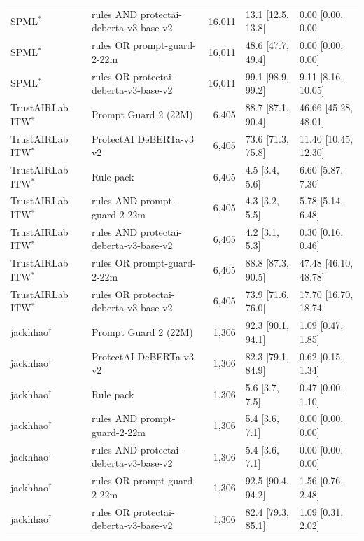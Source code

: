 \begin{tabular}{llrll}
SPML$^*$ & rules AND protectai-deberta-v3-base-v2 & 16,011 & 13.1 [12.5, 13.8] & 0.00 [0.00, 0.00] \\
SPML$^*$ & rules OR prompt-guard-2-22m & 16,011 & 48.6 [47.7, 49.4] & 0.00 [0.00, 0.00] \\
SPML$^*$ & rules OR protectai-deberta-v3-base-v2 & 16,011 & 99.1 [98.9, 99.2] & 9.11 [8.16, 10.05] \\
TrustAIRLab ITW$^*$ & Prompt Guard 2 (22M) & 6,405 & 88.7 [87.1, 90.4] & 46.66 [45.28, 48.01] \\
TrustAIRLab ITW$^*$ & ProtectAI DeBERTa-v3 v2 & 6,405 & 73.6 [71.3, 75.8] & 11.40 [10.45, 12.30] \\
TrustAIRLab ITW$^*$ & Rule pack & 6,405 & 4.5 [3.4, 5.6] & 6.60 [5.87, 7.30] \\
TrustAIRLab ITW$^*$ & rules AND prompt-guard-2-22m & 6,405 & 4.3 [3.2, 5.5] & 5.78 [5.14, 6.48] \\
TrustAIRLab ITW$^*$ & rules AND protectai-deberta-v3-base-v2 & 6,405 & 4.2 [3.1, 5.3] & 0.30 [0.16, 0.46] \\
TrustAIRLab ITW$^*$ & rules OR prompt-guard-2-22m & 6,405 & 88.8 [87.3, 90.5] & 47.48 [46.10, 48.78] \\
TrustAIRLab ITW$^*$ & rules OR protectai-deberta-v3-base-v2 & 6,405 & 73.9 [71.6, 76.0] & 17.70 [16.70, 18.74] \\
jackhhao$^\dagger$ & Prompt Guard 2 (22M) & 1,306 & 92.3 [90.1, 94.1] & 1.09 [0.47, 1.85] \\
jackhhao$^\dagger$ & ProtectAI DeBERTa-v3 v2 & 1,306 & 82.3 [79.1, 84.9] & 0.62 [0.15, 1.34] \\
jackhhao$^\dagger$ & Rule pack & 1,306 & 5.6 [3.7, 7.5] & 0.47 [0.00, 1.10] \\
jackhhao$^\dagger$ & rules AND prompt-guard-2-22m & 1,306 & 5.4 [3.6, 7.1] & 0.00 [0.00, 0.00] \\
jackhhao$^\dagger$ & rules AND protectai-deberta-v3-base-v2 & 1,306 & 5.4 [3.6, 7.1] & 0.00 [0.00, 0.00] \\
jackhhao$^\dagger$ & rules OR prompt-guard-2-22m & 1,306 & 92.5 [90.4, 94.2] & 1.56 [0.76, 2.48] \\
jackhhao$^\dagger$ & rules OR protectai-deberta-v3-base-v2 & 1,306 & 82.4 [79.3, 85.1] & 1.09 [0.31, 2.02] \\
\bottomrule
\end{tabular}
